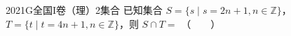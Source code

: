 
\begin{problem}{2021}{G}{全国I卷（理）}{2}{集合}
已知集合 $ S=\{s\mid s=2n+1,n\in\mathbb{Z}\} $，$ T=\{t\mid t=4n+1,n\in\mathbb{Z}\} $，则 $ S\cap T= $ \hspace{1cm}（　　）
\begin{choices}
\choice{{ $ \varnothing $ }}
\end{choices}
\end{problem}

\begin{answer}

\end{answer}

\begin{solutions}

\end{solutions}